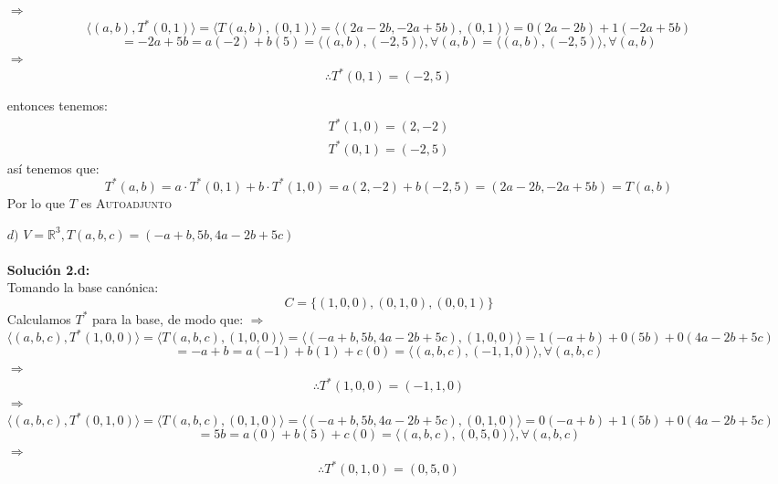 \begin{itemize}
        $\Rightarrow$
        $$\langle (a,b),T^*(0,1)\rangle =\langle T(a,b),(0,1)\rangle =\langle (2a-2b,-2a+5b),(0,1)\rangle=0(2a-2b)+1(-2a+5b)$$ $$=-2a+5b=a(-2)+b(5)=\langle (a,b),(-2,5)\rangle , \forall (a,b)=\langle (a,b),(-2,5)\rangle , \forall (a,b)$$
        $\Rightarrow$
        $$\therefore T^*(0,1)=(-2,5)$$

        entonces tenemos:\\
        \begin{align*}
           T^*(1,0)=(2,-2)\\
           T^*(0,1)=(-2,5)
        \end{align*}
        así tenemos que:
        $$T^*(a,b)=a\cdot T^*(0,1)+b\cdot T^*(1,0)=a(2,-2)+b(-2,5)=(2a-2b,-2a+5b)=T(a,b)$$
       Por lo que $T$ es \textsc{Autoadjunto}
        
    \item [$d)$]$V=\mathbb{R}^3,T(a,b,c)=(-a+b,5b, 4a-2b+5c)$\\\\
        \textbf{Soluci\'on 2.d:}\\
         Tomando la base can\'onica:
    $$C=\{(1,0,0),(0,1,0),(0,0,1)\}$$
Calculamos $T^*$ para la base, de modo que:
        $\Rightarrow$
        $$\langle (a,b,c),T^*(1,0,0)\rangle =\langle T(a,b,c),(1,0,0)\rangle=\langle (-a+b,5b, 4a-2b+5c),(1,0,0)\rangle=1(-a+b)+0(5b)+0(4a-2b+5c) $$
        $$=-a+b=a(-1)+b(1)+c(0)=\langle (a,b,c),(-1,1,0)\rangle , \forall (a,b,c)$$
        $\Rightarrow$
        $$\therefore T^*(1,0,0)=(-1,1,0)$$
        $\Rightarrow$
        $$\langle (a,b,c),T^*(0,1,0)\rangle =\langle T(a,b,c),(0,1,0)\rangle=\langle (-a+b,5b, 4a-2b+5c),(0,1,0)\rangle=0(-a+b)+1(5b)+0(4a-2b+5c) $$
        $$=5b=a(0)+b(5)+c(0)=\langle (a,b,c),(0,5,0)\rangle , \forall (a,b,c)$$
        $\Rightarrow$
        $$\therefore T^*(0,1,0)=(0,5,0)$$
        

\end{itemize}
